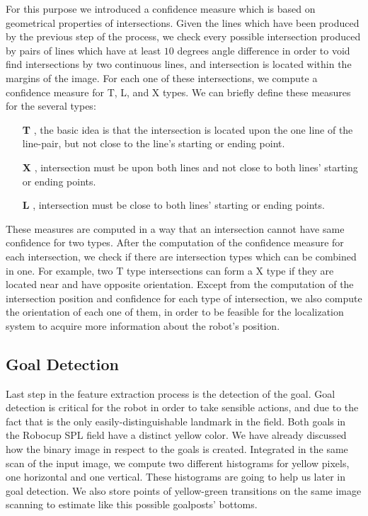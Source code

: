 \documentclass[	DIV=calc,%
							paper=a4,%
							fontsize=9pt,%
							twocolumn]{scrartcl}	 					%
\begin{document}
For this purpose we introduced a confidence measure which is based on geometrical properties of intersections. Given the lines which have been produced by the previous step of the process, we check every possible intersection produced by pairs of lines which have at least $10$ degrees angle difference in order to void find intersections by two continuous lines, and intersection is located within the margins of the image. For each one of these intersections, we compute a confidence measure for T, L, and X types. We can briefly define these measures for the several types:
\begin{itemize}
\item[\textbf{T}]{, the basic idea is that the intersection is located upon the one line of the line-pair, but not close to the line's starting or ending point.}
\item[\textbf{X}]{, intersection must be upon both lines and not close to both lines' starting or ending points. }
\item[\textbf{L}]{, intersection must be close to both lines' starting or ending points.}
\end{itemize}
These measures are computed in a way that an intersection cannot have same confidence for two types. After the computation of the confidence measure for each intersection, we check if there are intersection types which can be combined in one. For example, two T type intersections can form a X type if they are located near and have opposite orientation. Except from the computation of the intersection position and confidence for each type of intersection, we also compute the orientation of each one of them, in order to be feasible for the localization system to acquire more information about the robot's position.

\subsection{Goal Detection}
Last step in the feature extraction process is the detection of the goal. Goal detection is critical for the robot in order to take sensible actions, and due to the fact that is the only easily-distinguishable landmark in the field. Both goals in the Robocup SPL field have a distinct yellow color. We have already discussed how the binary image in respect to the goals is created. Integrated in the same scan of the input image, we compute two different histograms for yellow pixels, one horizontal and one vertical. These histograms are going to help us later in goal detection. We also store points of yellow-green transitions on the same image scanning to estimate like this possible goalposts' bottoms.
\end{document}
